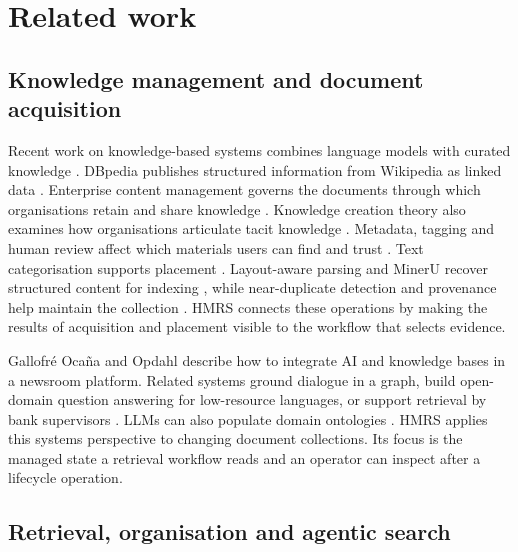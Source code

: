 \section{Related work}
\label{sec:related}

\subsection{Knowledge management and document acquisition}

Recent work on knowledge-based systems combines language models with curated
knowledge \citep{yang-kbs-llm-2025}. DBpedia publishes structured
information from Wikipedia as linked data \citep{auer-dbpedia-kb-2007}.
Enterprise content management governs the documents through which
organisations retain and share knowledge
\citep{paivarinta-ecm-2005,tyrvaainen-ecm-2006}. Knowledge creation theory
also examines how organisations articulate tacit knowledge
\citep{nonaka-seci-1994}.
Metadata, tagging and human review affect which materials users can find and
trust \citep{park-metadata-quality-2009,golder-tagging-2006,mosqueira-rey-hitl-2022}.
Text categorisation supports placement \citep{sebastiani2002machine}.
Layout-aware parsing and MinerU recover structured content for indexing
\citep{zhong-publaynet-layout-2019,huang-layoutlmv3-docai-2022,mineru}, while
near-duplicate detection and provenance help maintain the collection
\citep{manku-near-dup-2007,missier-prov-2013,cheney-provenance-2009}.
HMRS connects these operations by making the results of acquisition and
placement visible to the workflow that selects evidence.

Gallofr\'e Oca\~na and Opdahl \citep{ocaa2023software} describe how to
integrate AI and knowledge bases in a newsroom platform. Related systems
ground dialogue in a graph, build open-domain question answering for
low-resource languages, or support retrieval by bank supervisors
\citep{yang2024building,budur2024building,aarab2024system}. LLMs can also
populate domain ontologies \citep{ciatto2025large}. HMRS applies this systems
perspective to changing document collections. Its focus is the managed
state a retrieval workflow reads and an operator can inspect after a
lifecycle operation.

\subsection{Retrieval, organisation and agentic search}

